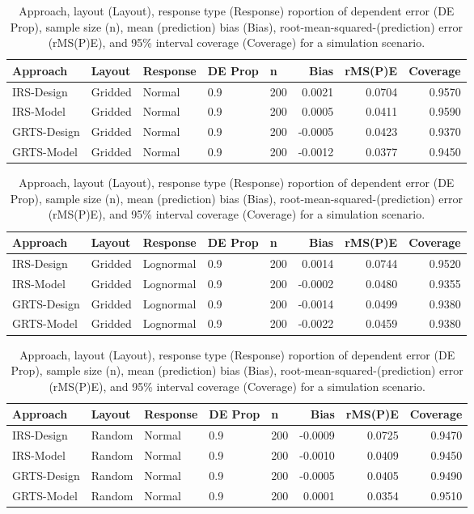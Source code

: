 \documentclass[]{elsarticle} %
\begin{document}
\begin{table}[ht]
\centering
\begin{tabular}{lllllrrr}
  \hline
Approach & Layout & Response & DE Prop & n & Bias & rMS(P)E & Coverage \\ 
  \hline
IRS-Design & Gridded & Normal & 0.9 & 200 & 0.0021 & 0.0704 & 0.9570 \\ 
  IRS-Model & Gridded & Normal & 0.9 & 200 & 0.0005 & 0.0411 & 0.9590 \\ 
  GRTS-Design & Gridded & Normal & 0.9 & 200 & -0.0005 & 0.0423 & 0.9370 \\ 
  GRTS-Model & Gridded & Normal & 0.9 & 200 & -0.0012 & 0.0377 & 0.9450 \\ 
   \hline
\end{tabular}
\caption{Approach, layout (Layout), response type (Response) roportion of dependent error (DE Prop), sample size (n), mean (prediction) bias (Bias), root-mean-squared-(prediction) error (rMS(P)E), and 95\% interval coverage (Coverage) for a simulation scenario.} 
\end{table}
\begin{table}[ht]
\centering
\begin{tabular}{lllllrrr}
  \hline
Approach & Layout & Response & DE Prop & n & Bias & rMS(P)E & Coverage \\ 
  \hline
IRS-Design & Gridded & Lognormal & 0.9 & 200 & 0.0014 & 0.0744 & 0.9520 \\ 
  IRS-Model & Gridded & Lognormal & 0.9 & 200 & -0.0002 & 0.0480 & 0.9355 \\ 
  GRTS-Design & Gridded & Lognormal & 0.9 & 200 & -0.0014 & 0.0499 & 0.9380 \\ 
  GRTS-Model & Gridded & Lognormal & 0.9 & 200 & -0.0022 & 0.0459 & 0.9380 \\ 
   \hline
\end{tabular}
\caption{Approach, layout (Layout), response type (Response) roportion of dependent error (DE Prop), sample size (n), mean (prediction) bias (Bias), root-mean-squared-(prediction) error (rMS(P)E), and 95\% interval coverage (Coverage) for a simulation scenario.} 
\end{table}
\begin{table}[ht]
\centering
\begin{tabular}{lllllrrr}
  \hline
Approach & Layout & Response & DE Prop & n & Bias & rMS(P)E & Coverage \\ 
  \hline
IRS-Design & Random & Normal & 0.9 & 200 & -0.0009 & 0.0725 & 0.9470 \\ 
  IRS-Model & Random & Normal & 0.9 & 200 & -0.0010 & 0.0409 & 0.9450 \\ 
  GRTS-Design & Random & Normal & 0.9 & 200 & -0.0005 & 0.0405 & 0.9490 \\ 
  GRTS-Model & Random & Normal & 0.9 & 200 & 0.0001 & 0.0354 & 0.9510 \\ 
   \hline
\end{tabular}
\caption{Approach, layout (Layout), response type (Response) roportion of dependent error (DE Prop), sample size (n), mean (prediction) bias (Bias), root-mean-squared-(prediction) error (rMS(P)E), and 95\% interval coverage (Coverage) for a simulation scenario.} 
\end{table}
\end{document}
